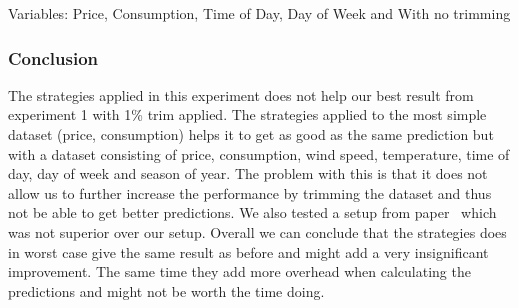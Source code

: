 Variables: Price, Consumption, Time of Day, Day of Week and	With no trimming
\begin{table}[H]
\centering  %
\caption{Scatter text~\cite{singhal2011electricity} with other statistical features and 1\% trim} %
\label{table:scatter_text_1p_trim} %
\end{table}

\subsubsection{Conclusion}
The strategies applied in this experiment does not help our best result from experiment 1 with 1\% trim applied. The strategies applied to the most simple dataset (price, consumption) helps it to get as good as the same prediction but with a dataset consisting of price, consumption, wind speed, temperature, time of day, day of week and season of year. The problem with this is that it does not allow us to further increase the performance by trimming the dataset and thus not be able to get better predictions. We also tested a setup from paper~\cite{singhal2011electricity} which was not superior over our setup. Overall we can conclude that the strategies does in worst case give the same result as before and might add a very insignificant improvement. The same time they add more overhead when calculating the predictions and might not be worth the time doing.

